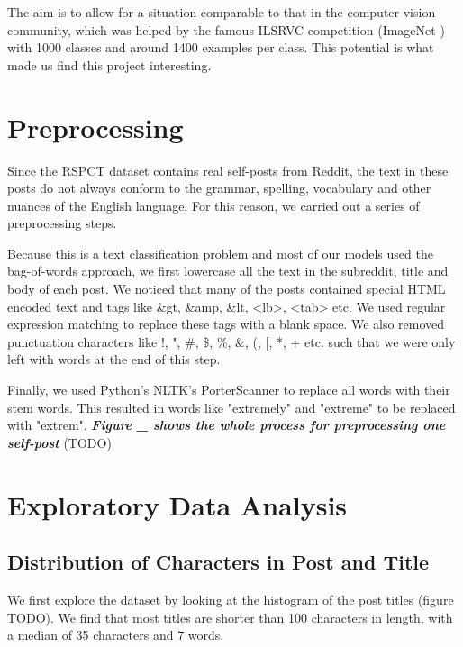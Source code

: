 \documentclass{sig-alternate-05-2015}
\begin{document}
The aim is to allow for a situation comparable to that in the computer vision community, which was helped by the famous ILSRVC competition (ImageNet \cite{imagenet}) with 1000 classes and around 1400 examples per class. This potential is what made us find this project interesting.

\section{Preprocessing}

Since the RSPCT dataset contains real self-posts from Reddit, the text in these posts do not always conform to the grammar, spelling, vocabulary and other nuances of the English language. For this reason, we carried out a series of preprocessing steps.

Because this is a text classification problem and most of our models used the bag-of-words approach, we first lowercase all the text in the subreddit, title and body of each post. We noticed that many of the posts contained special HTML encoded text and tags like \&gt, \&amp, \&lt, <lb>, <tab> etc. We used regular expression matching to replace these tags with a blank space. We also removed punctuation characters like !, ", \#, \$, \%, \&, (, [, *, + etc. such that we were only left with words at the end of this step.

Finally, we used Python's NLTK's PorterScanner to replace all words with their stem words. This resulted in words like "extremely" and "extreme" to be replaced with "extrem". \textit{\textbf{Figure \_ shows the whole process for preprocessing one self-post}} (TODO)

\section{Exploratory Data Analysis}

\subsection{Distribution of Characters in Post and Title}

We first explore the dataset by looking at the histogram of the post titles (figure TODO). We find that most titles are shorter than 100 characters in length, with a median of 35 characters and 7 words.
\end{document}
